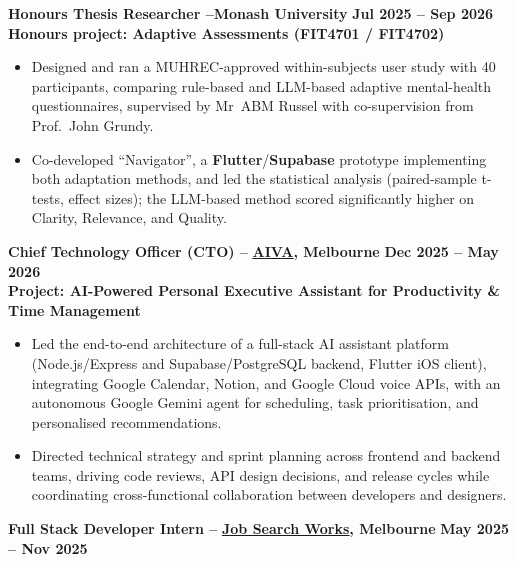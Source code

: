\documentclass[11pt, a4paper]{article}
\let\hrefnoul\href
\renewcommand{\href}[2]{\hrefnoul{#1}{\ul{#2}}}
\begin{document}
\vspace{4pt}
\noindent\textbf{Honours Thesis Researcher –\quad Monash University}%
\hfill\textbf{Jul 2025 – Sep 2026}\\
\textbf{Honours project: Adaptive Assessments (FIT4701 / FIT4702)}

\begin{itemize}[leftmargin=1.5em, itemsep=2pt, topsep=1pt, parsep=0pt]
  \item Designed and ran a MUHREC-approved within-subjects user study with 40 participants,
        comparing rule-based and LLM-based adaptive mental-health questionnaires, supervised by
        Mr~ABM Russel with co-supervision from Prof.~John Grundy.

  \item Co-developed ``Navigator'', a \textbf{Flutter}/\textbf{Supabase} prototype implementing
        both adaptation methods, and led the statistical analysis (paired-sample t-tests, effect
        sizes); the LLM-based method scored significantly higher on Clarity, Relevance, and Quality.
\end{itemize}

\vspace{4pt}
\noindent\textbf{Chief Technology Officer (CTO) –}
\href{https://github.com/AIVA-MVP}{\textbf{AIVA}}\textbf{, Melbourne}%
\hfill\textbf{Dec 2025 – May 2026}\\
\textbf{Project: AI-Powered Personal Executive Assistant for Productivity \& Time Management}

\begin{itemize}[leftmargin=1.5em, itemsep=2pt, topsep=1pt, parsep=0pt]
  \item Led the end-to-end architecture of a full-stack AI assistant platform (Node.js/Express
        and Supabase/PostgreSQL backend, Flutter iOS client), integrating Google Calendar, Notion,
        and Google Cloud voice APIs, with an autonomous Google Gemini agent for scheduling,
        task prioritisation, and personalised recommendations.

  \item Directed technical strategy and sprint planning across frontend and backend teams,
        driving code reviews, API design decisions, and release cycles while coordinating
        cross-functional collaboration between developers and designers.
\end{itemize}

\vspace{4pt}
\noindent\textbf{Full Stack Developer Intern –}
\href{https://app.jobsearch.works/}{\textbf{Job Search Works}}\textbf{, Melbourne}%
\hfill\textbf{May 2025 – Nov 2025}
\end{document}
